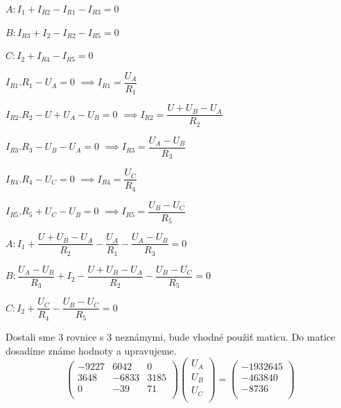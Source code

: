 \documentclass[10pt,a4paper]{article}
\begin{document}
\newpage

$A: I_{1}+I_{R2}-I_{R1}-I_{R3}=0  $

$B: I_{R3}+I_{2}-I_{R2}-I_{R5}=0  $

$C: I_{2}+I_{R4}-I_{R5}=0  $

\vspace*{0.5cm}
$ I_{R1}.R_{1}-U_{A}=0$\hspace*{2.7cm}
$\implies I_{R1}=\dfrac{U_{A}}{R_{1}}$
\vspace*{0.1cm}

$ I_{R2}.R_{2}-U+U_{A}-U_{B}=0$
\hspace*{1cm} 
$\implies I_{R2}=\dfrac{U+U_{B}-U_{A}}{R_{2}}$
\vspace*{0.1cm}

$ I_{R3}.R_{3}-U_{B}-U_{A}=0$\hspace*{1.8cm}
$\implies I_{R3}=\dfrac{U_{A}-U_{B}}{R_{3}}$
\vspace*{0.1cm}

$ I_{R4}.R_{4}-U_{C}=0$\hspace*{2.7cm}
$\implies I_{R4}=\dfrac{U_{C}}{R_{4}}$
\vspace*{0.1cm}

$ I_{R5}.R_{5}+U_{C}-U_{B}=0$\hspace*{1.8cm}
$\implies I_{R5}=\dfrac{U_{B}-U_{C}}{R_{5}}$
\vspace*{0.5cm}

$A: I_{1} + \dfrac{U+U_{B}-U_{A}}{R_{2}}-\dfrac{U_{A}}{R_{1}}-\dfrac{U_{A}-U_{B}}{R_{3}}=0$

\vspace*{0.3cm}
$B: \dfrac{U_{A}-U_{B}}{R_{3}}+I_{2}-\dfrac{U+U_{B}-U_{A}}{R_{2}}-\dfrac{U_{B}-U_{C}}{R_{5}}=0$

\vspace*{0.3cm}

$C: I_{2}+\dfrac{U_{C}}{R_{4}}-\dfrac{U_{B}-U_{C}}{R_{5}}=0  $

\vspace*{0.5cm}
Dostali sme 3 rovnice s 3 neznámymi, bude vhodné použiť maticu.
Do matice dosadíme známe \hspace*{0.5cm}hodnoty a upravujeme. \\

\[
\begin{pmatrix}
-9227 & 6042 & 0 \\ 3648 &-6833 & 3185 \\ 0 & -39 & 71 \\
\end{pmatrix}
\begin{pmatrix}
U_{A} \\ U_{B} \\ U_{C} \\
\end{pmatrix}
=
\begin{pmatrix}
-1932645 \\ -463840 \\ -8736 \\
\end{pmatrix}
\]
\end{document}
